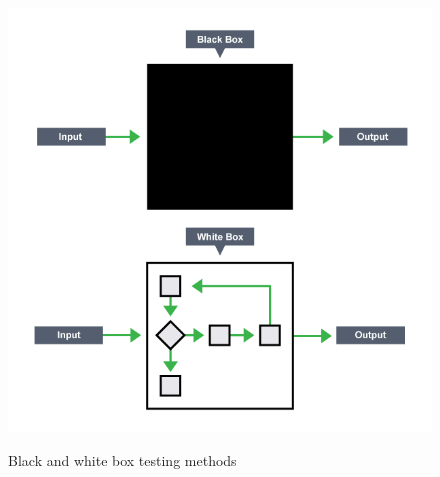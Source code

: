 \documentclass[english,12pt,a4paper,pdftex,elec,utf8]{aaltothesis}
\begin{document}
\begin{figure}[h!]
\caption{Black and white box testing methods}
\includegraphics[scale=0.3]{blackvswhite}
\label{boxfigure}
\end{figure} 
\end{document}
